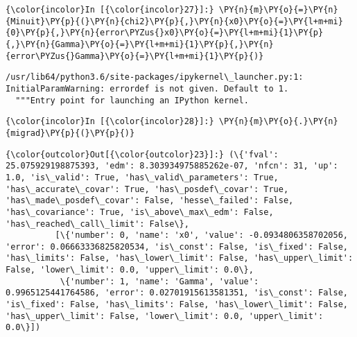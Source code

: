     \begin{Verbatim}[commandchars=\\\{\}]
{\color{incolor}In [{\color{incolor}27}]:} \PY{n}{m}\PY{o}{=}\PY{n}{Minuit}\PY{p}{(}\PY{n}{chi2}\PY{p}{,}\PY{n}{x0}\PY{o}{=}\PY{l+m+mi}{0}\PY{p}{,}\PY{n}{error\PYZus{}x0}\PY{o}{=}\PY{l+m+mi}{1}\PY{p}{,}\PY{n}{Gamma}\PY{o}{=}\PY{l+m+mi}{1}\PY{p}{,}\PY{n}{error\PYZus{}Gamma}\PY{o}{=}\PY{l+m+mi}{1}\PY{p}{)}
\end{Verbatim}


    \begin{Verbatim}[commandchars=\\\{\}]
/usr/lib64/python3.6/site-packages/ipykernel\_launcher.py:1: InitialParamWarning: errordef is not given. Default to 1.
  """Entry point for launching an IPython kernel.

    \end{Verbatim}

    \begin{Verbatim}[commandchars=\\\{\}]
{\color{incolor}In [{\color{incolor}28}]:} \PY{n}{m}\PY{o}{.}\PY{n}{migrad}\PY{p}{(}\PY{p}{)}
\end{Verbatim}


    
    
    
    
    
    
    
    
\begin{Verbatim}[commandchars=\\\{\}]
{\color{outcolor}Out[{\color{outcolor}23}]:} (\{'fval': 25.075929198875393, 'edm': 8.303934975885262e-07, 'nfcn': 31, 'up': 1.0, 'is\_valid': True, 'has\_valid\_parameters': True, 'has\_accurate\_covar': True, 'has\_posdef\_covar': True, 'has\_made\_posdef\_covar': False, 'hesse\_failed': False, 'has\_covariance': True, 'is\_above\_max\_edm': False, 'has\_reached\_call\_limit': False\},
          [\{'number': 0, 'name': 'x0', 'value': -0.0934806358702056, 'error': 0.06663336825820534, 'is\_const': False, 'is\_fixed': False, 'has\_limits': False, 'has\_lower\_limit': False, 'has\_upper\_limit': False, 'lower\_limit': 0.0, 'upper\_limit': 0.0\},
           \{'number': 1, 'name': 'Gamma', 'value': 0.9965125441764586, 'error': 0.02701915613581351, 'is\_const': False, 'is\_fixed': False, 'has\_limits': False, 'has\_lower\_limit': False, 'has\_upper\_limit': False, 'lower\_limit': 0.0, 'upper\_limit': 0.0\}])
\end{Verbatim}
            
